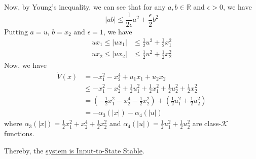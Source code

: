 Now, by Young's inequality, we can see that for any \( a, b \in \mathbb{R} \) and \( \epsilon > 0 \), we have
\begin{equation*}
    \left| a b \right|
    \leq
    \frac{1}{2 \epsilon} a^2 + \frac{\epsilon}{2} b^2
\end{equation*}
Putting \( a = u \), \( b = x_2 \) and \( \epsilon = 1 \), we have
\begin{align*}
    u x_1 \leq \left| u x_1 \right|
     & \leq
    \frac{1}{2} u^2 + \frac{1}{2} x_1^2
    \\
    u x_2 \leq \left| u x_2 \right|
     & \leq
    \frac{1}{2} u^2 + \frac{1}{2} x_2^2
\end{align*}
Now, we have
\begin{align*}
    \dot{V}(x)
     & =
    -x_1^2 - x_2^4 + u_1 x_1 + u_2 x_2
    \\ & \leq
    -x_1^2 - x_2^4 + \frac{1}{2} u_1^2 + \frac{1}{2} x_1^2 + \frac{1}{2} u_2^2 + \frac{1}{2} x_2^2
    \\ & =
    \left( - \frac{1}{2} x_1^2 -x_2^4 - \frac{1}{2} x_2^2 \right) + \left( \frac{1}{2} u_1^2 + \frac{1}{2} u_2^2 \right)
    \\ & =
    - \alpha_3(|x|) - \alpha_4(|u|)
\end{align*}
where \( \alpha_3(|x|) = \frac{1}{2} x_1^2 + x_2^4 + \frac{1}{2} x_2^2 \) and \( \alpha_4(|u|) = \frac{1}{2} u_1^2 + \frac{1}{2} u_2^2 \) are class-\( \mathcal{K} \) functions.

Thereby, the \underline{system is Input-to-State Stable}.
